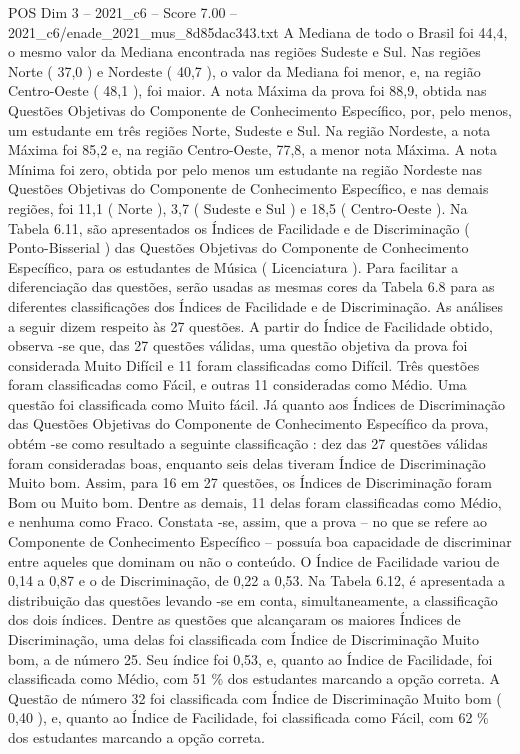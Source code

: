\begin{textsample}{POS Dim 3 – 2021\_c6 – Score 7.00 – 2021\_c6/enade\_2021\_mus\_8d85dac343.txt}
A Mediana de todo o Brasil foi 44,4, o mesmo valor da Mediana encontrada nas regiões Sudeste e Sul.
Nas regiões Norte ( 37,0 ) e Nordeste ( 40,7 ), o valor da Mediana foi menor, e, na região Centro-Oeste ( 48,1 ), foi maior.
A nota Máxima da prova foi 88,9, obtida nas Questões Objetivas do Componente de Conhecimento Específico, por, pelo menos, um estudante em três regiões Norte, Sudeste e Sul.
Na região Nordeste, a nota Máxima foi 85,2 e, na região Centro-Oeste, 77,8, a menor nota Máxima.
A nota Mínima foi zero, obtida por pelo menos um estudante na região Nordeste nas Questões Objetivas do Componente de Conhecimento Específico, e nas demais regiões, foi 11,1 ( Norte ), 3,7 ( Sudeste e Sul ) e 18,5 ( Centro-Oeste ).
Na Tabela 6.11, são apresentados os Índices de Facilidade e de Discriminação ( Ponto-Bisserial ) das Questões Objetivas do Componente de Conhecimento Específico, para os estudantes de Música ( Licenciatura ).
Para facilitar a diferenciação das questões, serão usadas as mesmas cores da Tabela 6.8 para as diferentes classificações dos Índices de Facilidade e de Discriminação.
As análises a seguir dizem respeito às 27 questões.
A partir do Índice de Facilidade obtido, observa -se que, das 27 questões válidas, uma questão objetiva da prova foi considerada Muito Difícil e 11 foram classificadas como Difícil.
Três questões foram classificadas como Fácil, e outras 11 consideradas como Médio.
Uma questão foi classificada como Muito fácil.
Já quanto aos Índices de Discriminação das Questões Objetivas do Componente de Conhecimento Específico da prova, obtém -se como resultado a seguinte classificação : dez das 27 questões válidas foram consideradas boas, enquanto seis delas tiveram Índice de Discriminação Muito bom.
Assim, para 16 em 27 questões, os Índices de Discriminação foram Bom ou Muito bom.
Dentre as demais, 11 delas foram classificadas como Médio, e nenhuma como Fraco.
Constata -se, assim, que a prova – no que se refere ao Componente de Conhecimento Específico – possuía boa capacidade de discriminar entre aqueles que dominam ou não o conteúdo.
O Índice de Facilidade variou de 0,14 a 0,87 e o de Discriminação, de 0,22 a 0,53.
Na Tabela 6.12, é apresentada a distribuição das questões levando -se em conta, simultaneamente, a classificação dos dois índices.
Dentre as questões que alcançaram os maiores Índices de Discriminação, uma delas foi classificada com Índice de Discriminação Muito bom, a de número 25.
Seu índice foi 0,53, e, quanto ao Índice de Facilidade, foi classificada como Médio, com 51 \% dos estudantes marcando a opção correta.
A Questão de número 32 foi classificada com Índice de Discriminação Muito bom ( 0,40 ), e, quanto ao Índice de Facilidade, foi classificada como Fácil, com 62 \% dos estudantes marcando a opção correta.

\end{textsample}
